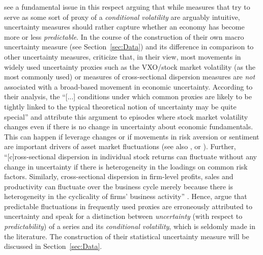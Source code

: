 \documentclass[a4paper,11pt,listof=nochaptergap,oneside,pointednumbers,bibtotoc,bigheadings,liststotoc,hidelinks]{scrbook}
\theoremstyle{mysatz}
\theoremstyle{mydefinition}
\theoremstyle{mytheorem}
\theoremstyle{mybemerkung}
\begin{document}
\citet{juradoetal:15} see a fundamental issue in this respect arguing that while measures that try to serve as some sort of proxy of a \textit{conditional volatility} are arguably intuitive, uncertainty measures should rather capture whether an economy has become more or less \textit{predictable}. In the course of the construction of their own macro uncertainty measure (see Section~\ref{sec:Data}) and its difference in comparison to other uncertainty measures, \citet{juradoetal:15} criticize that, in their view, most movements in widely used uncertainty proxies such as the VXO/stock market volatility (as the most commonly used) or measures of cross-sectional dispersion measures are \textit{not} associated with a broad-based movement in economic uncertainty. According to their analysis, the ``[...] conditions under which common proxies are likely to be tightly linked to the typical theoretical notion of uncertainty may be quite special'' \citep[p. 1178]{juradoetal:15} and attribute this argument to episodes where stock market volatility changes even if there is no change in uncertainty about economic fundamentals. This can happen if leverage changes or if movements in risk aversion or sentiment are important drivers of asset market fluctuations (see also \citet{bekaertetal:13}, \citet{moore:17} or \citet{IMF:17}). Further, ``[c]ross-sectional dispersion in individual stock returns can fluctuate without any change in uncertainty if there is heterogeneity in the loadings on common risk factors. Similarly, cross-sectional dispersion in firm-level profits, sales and productivity can fluctuate over the business cycle merely because there is heterogeneity in the cyclicality of firms' business activity'' \citep[p. 1178]{juradoetal:15}. Hence, \citet{juradoetal:15} argue that predictable fluctuations in frequently used proxies are erroneously attributed to uncertainty and speak for a distinction between \textit{uncertainty} (with respect to \textit{predictability}) of a series and its \textit{conditional volatility}, which is seldomly made in the literature. The construction of their statistical uncertainty measure will be discussed in Section~\ref{sec:Data}.\\
\end{document}
